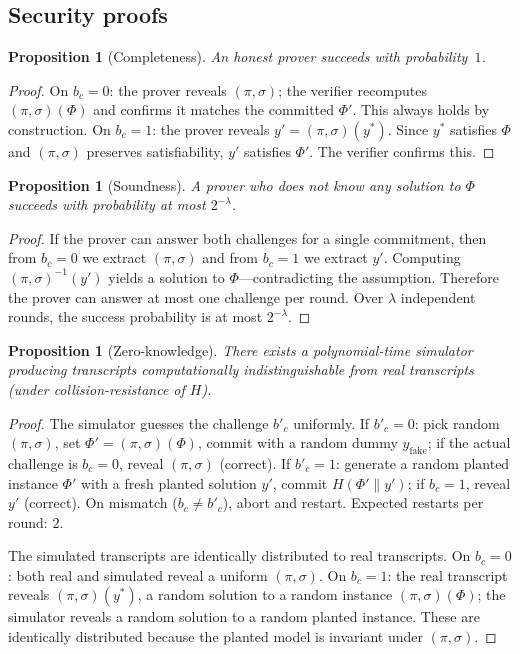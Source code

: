 \documentclass[11pt]{article}
\newtheorem{proposition}[theorem]{Proposition}
\begin{document}
\subsection{Security proofs}

\begin{proposition}[Completeness]\label{prop:complete}
An honest prover succeeds with probability~$1$.
\end{proposition}

\begin{proof}
On $b_c = 0$: the prover reveals $(\pi,\sigma)$; the verifier recomputes $(\pi,\sigma)(\Phi)$ and confirms it matches the committed $\Phi'$.  This always holds by construction.  On $b_c = 1$: the prover reveals $y' = (\pi,\sigma)(y^*)$.  Since $y^*$ satisfies $\Phi$ and $(\pi,\sigma)$ preserves satisfiability, $y'$ satisfies $\Phi'$.  The verifier confirms this.
\end{proof}

\begin{proposition}[Soundness]\label{prop:sound}
A prover who does not know any solution to $\Phi$ succeeds with probability at most $2^{-\lambda}$.
\end{proposition}

\begin{proof}
If the prover can answer both challenges for a single commitment, then from $b_c = 0$ we extract $(\pi,\sigma)$ and from $b_c = 1$ we extract $y'$.  Computing $(\pi,\sigma)^{-1}(y')$ yields a solution to $\Phi$---contradicting the assumption.  Therefore the prover can answer at most one challenge per round.  Over $\lambda$ independent rounds, the success probability is at most $2^{-\lambda}$.
\end{proof}

\begin{proposition}[Zero-knowledge]\label{prop:zk}
There exists a polynomial-time simulator producing transcripts computationally indistinguishable from real transcripts (under collision-resistance of $H$).
\end{proposition}

\begin{proof}
The simulator guesses the challenge $b'_c$ uniformly.  If $b'_c = 0$: pick random $(\pi,\sigma)$, set $\Phi' = (\pi,\sigma)(\Phi)$, commit with a random dummy $y_{\mathrm{fake}}$; if the actual challenge is $b_c = 0$, reveal $(\pi,\sigma)$ (correct).  If $b'_c = 1$: generate a random planted instance $\Phi'$ with a fresh planted solution $y'$, commit $H(\Phi' \| y')$; if $b_c = 1$, reveal $y'$ (correct).  On mismatch ($b_c \neq b'_c$), abort and restart.  Expected restarts per round: $2$.

The simulated transcripts are identically distributed to real transcripts.  On $b_c = 0$: both real and simulated reveal a uniform $(\pi,\sigma)$.  On $b_c = 1$: the real transcript reveals $(\pi,\sigma)(y^*)$, a random solution to a random instance $(\pi,\sigma)(\Phi)$; the simulator reveals a random solution to a random planted instance.  These are identically distributed because the planted model is invariant under $(\pi,\sigma)$.
\end{proof}
\end{document}
